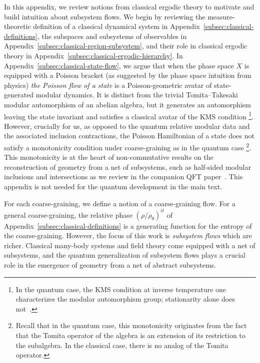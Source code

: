 \documentclass[a4paper,11pt]{article}
\theoremstyle{definition}
\begin{document}
In this appendix, we review notions from classical ergodic theory to motivate and build intuition about subsystem flows.
We begin by reviewing the measure-theoretic definition of a classical dynamical system in Appendix~\ref{subsec:classical-definitions}, the subspaces and subsystems of observables in Appendix~\ref{subsec:classical-region-subsystem}, and their role in classical ergodic theory in Appendix~\ref{subsec:classical-ergodic-hierarchy}. In Appendix~\ref{subsec:classical-state-flow}, we argue that when the phase space $X$ is equipped with a Poisson bracket (as suggested by the phase space intuition from physics) {\it the Poisson flow of a state} is a Poisson-geometric avatar of state-generated modular dynamics. It is distinct from the trivial Tomita--Takesaki modular automorphism of an abelian algebra, but it generates an automorphism leaving the state invariant and satisfies a classical avatar of the KMS condition \footnote{In the quantum case, the KMS condition at inverse temperature one characterizes the modular automorphism group; stationarity alone does not~\cite{Takesaki1970}.}. However, crucially for us, as opposed to the quantum relative modular data and the associated inclusion contractions, the Poisson Hamiltonian of a state does not satisfy a monotonicity condition under coarse-graining as in the quantum case \footnote{Recall that in the quantum case, this monotonicity originates from the fact that the Tomita operator of the algebra is an extension of its restriction to the subalgebra. In the classical case, there is no analog of the Tomita operator.}. This monotonicity is at the heart of non-commutative results on the reconstruction of geometry from a net of subsystems, such as half-sided modular inclusions and intersections as we review in the companion QFT paper~\cite{companionQFT}. This appendix is not needed for the quantum development in the main text.

For each coarse-graining, we define a notion of a coarse-graining flow. For a general coarse-graining, the relative phase $(\rho/\rho_0)^{it}$ of Appendix~\ref{subsec:classical-definitions} is a generating function for the entropy of the coarse-graining. However, the focus of this work is {\it subsystem flows} which are richer.
Classical many-body systems and field theory come equipped with a net of subsystems, and the quantum generalization of subsystem flows plays a crucial role in the emergence of geometry from a net of abstract subsystems.
\end{document}
